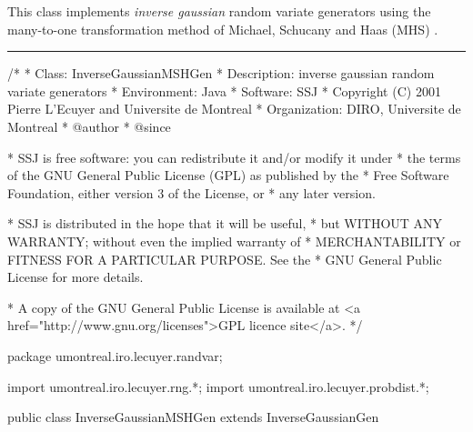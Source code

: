 
This class implements \emph{inverse gaussian} random variate generators using
the many-to-one transformation method of Michael, Schucany and Haas (MHS)
 \cite{rMIC76a,rDEV06a}.

\bigskip\hrule

\begin{code}
\begin{hide}
/*
 * Class:        InverseGaussianMSHGen
 * Description:  inverse gaussian random variate generators
 * Environment:  Java
 * Software:     SSJ 
 * Copyright (C) 2001  Pierre L'Ecuyer and Universite de Montreal
 * Organization: DIRO, Universite de Montreal
 * @author       
 * @since

 * SSJ is free software: you can redistribute it and/or modify it under
 * the terms of the GNU General Public License (GPL) as published by the
 * Free Software Foundation, either version 3 of the License, or
 * any later version.

 * SSJ is distributed in the hope that it will be useful,
 * but WITHOUT ANY WARRANTY; without even the implied warranty of
 * MERCHANTABILITY or FITNESS FOR A PARTICULAR PURPOSE.  See the
 * GNU General Public License for more details.

 * A copy of the GNU General Public License is available at
   <a href="http://www.gnu.org/licenses">GPL licence site</a>.
 */
\end{hide}
package umontreal.iro.lecuyer.randvar;\begin{hide}
import umontreal.iro.lecuyer.rng.*;
import umontreal.iro.lecuyer.probdist.*;
\end{hide}

public class InverseGaussianMSHGen extends InverseGaussianGen \begin{hide} {
   private NormalGen genN;
\end{hide}\end{code}

